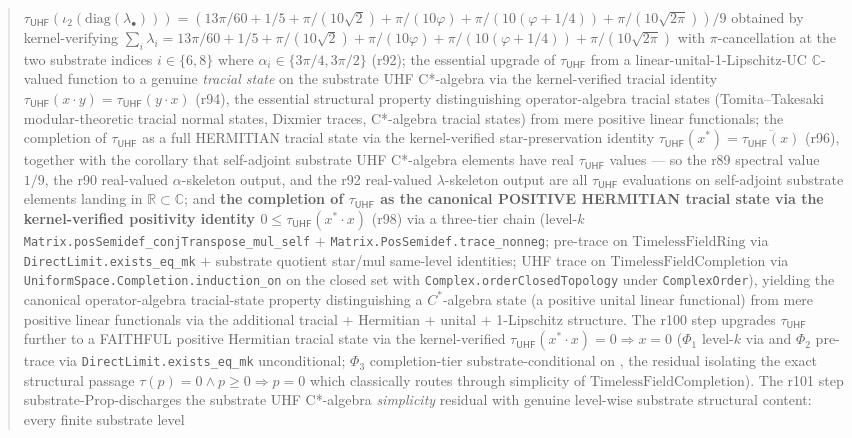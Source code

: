 \documentclass[11pt,a4paper]{amsart}
\theoremstyle{plain}
\theoremstyle{definition}
\begin{document}
\begin{abstract}
$\tau_{\textsf{UHF}}(\iota_2(\mathrm{diag}(\lambda_{\bullet}))) = (13\pi/60 + 1/5 + \pi/(10\sqrt{2}) + \pi/(10\varphi) + \pi/(10(\varphi+1/4)) + \pi/(10\sqrt{2\pi}))/9$ obtained by kernel-verifying $\sum_i \lambda_i = 13\pi/60 + 1/5 + \pi/(10\sqrt{2}) + \pi/(10\varphi) + \pi/(10(\varphi+1/4)) + \pi/(10\sqrt{2\pi})$ with $\pi$-cancellation at the two substrate indices $i \in \{6, 8\}$ where $\alpha_i \in \{3\pi/4, 3\pi/2\}$ (r92); the essential upgrade of $\tau_{\textsf{UHF}}$ from a linear-unital-1-Lipschitz-UC $\mathbb{C}$-valued function to a genuine \emph{tracial state} on the substrate UHF C*-algebra via the kernel-verified tracial identity $\tau_{\textsf{UHF}}(x \cdot y) = \tau_{\textsf{UHF}}(y \cdot x)$ (r94), the essential structural property distinguishing operator-algebra tracial states (Tomita--Takesaki modular-theoretic tracial normal states, Dixmier traces, C*-algebra tracial states) from mere positive linear functionals; the completion of $\tau_{\textsf{UHF}}$ as a full HERMITIAN tracial state via the kernel-verified star-preservation identity $\tau_{\textsf{UHF}}(x^*) = \overline{\tau_{\textsf{UHF}}(x)}$ (r96), together with the corollary that self-adjoint substrate UHF C*-algebra elements have real $\tau_{\textsf{UHF}}$ values --- so the r89 spectral value $1/9$, the r90 real-valued $\alpha$-skeleton output, and the r92 real-valued $\lambda$-skeleton output are all $\tau_{\textsf{UHF}}$ evaluations on self-adjoint substrate elements landing in $\mathbb{R} \subset \mathbb{C}$; and \textbf{the completion of $\tau_{\textsf{UHF}}$ as the canonical POSITIVE HERMITIAN tracial state via the kernel-verified positivity identity $0 \le \tau_{\textsf{UHF}}(x^* \cdot x)$} (r98) via a three-tier chain (level-$k$ \texttt{Matrix.posSemidef\_conjTranspose\_mul\_self} $+$ \texttt{Matrix.PosSemidef.trace\_nonneg}; pre-trace on $\mathrm{TimelessFieldRing}$ via \texttt{DirectLimit.exists\_eq\_mk} $+$ substrate quotient star/mul same-level identities; UHF trace on $\mathrm{TimelessFieldCompletion}$ via \texttt{UniformSpace.Completion.induction\_on} on the closed set with \texttt{Complex.orderClosedTopology} under \texttt{ComplexOrder}), yielding the canonical operator-algebra tracial-state property distinguishing a $C^*$-algebra state (a positive unital linear functional) from mere positive linear functionals via the additional tracial + Hermitian + unital $+$ 1-Lipschitz structure. The r100 step upgrades $\tau_{\textsf{UHF}}$ further to a FAITHFUL positive Hermitian tracial state via the kernel-verified $\tau_{\textsf{UHF}}(x^* \cdot x) = 0 \Rightarrow x = 0$ ($\Phi_1$ level-$k$ via  and $\Phi_2$ pre-trace via \texttt{DirectLimit.exists\_eq\_mk} unconditional; $\Phi_3$ completion-tier substrate-conditional on , the residual isolating the exact structural passage $\tau(p) = 0 \wedge p \ge 0 \Rightarrow p = 0$ which classically routes through simplicity of $\mathrm{TimelessFieldCompletion}$). The r101 step substrate-Prop-discharges the substrate UHF C*-algebra \emph{simplicity} residual with genuine level-wise substrate structural content: every finite substrate level 
\end{abstract}
\end{document}
